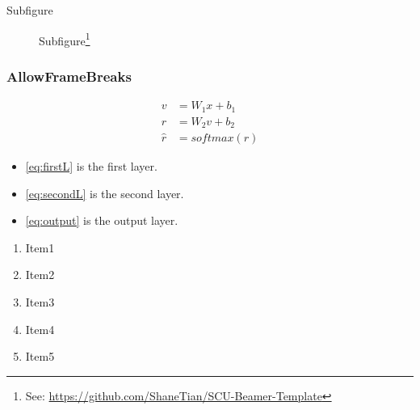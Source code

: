\documentclass[hyperref,UTF8,11pt]{beamer}
\begin{document}
\begin{frame}{Subfigure}
    \begin{figure}
        \centering
        \hskip 1cm
        \caption{Subfigure\footnote{See: \url{https://github.com/ShaneTian/SCU-Beamer-Template}}}
        \label{fig:subfigure}
    \end{figure}
\end{frame}

\begin{frame}[allowframebreaks]
    \frametitle{AllowFrameBreaks}
    \begin{align}
        v&=W_1 x+b_1\label{eq:firstL}\\
        r&=W_2 v+b_2\label{eq:secondL}\\
        \hat{r}&=softmax(r)\label{eq:output}
    \end{align}
    \begin{itemize}
        \item \eqref{eq:firstL} is the first layer.
        \item \eqref{eq:secondL} is the second layer.
        \item \eqref{eq:output} is the output layer.
    \end{itemize}
    \vskip 1cm
    \begin{enumerate}
        \item Item1
        \item Item2
        \item Item3
        \item Item4
        \item Item5
    \end{enumerate}
\end{frame}
\end{document}
